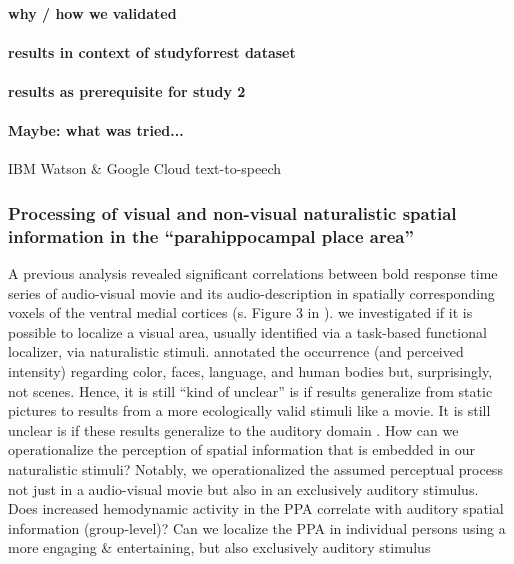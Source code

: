 \paragraph{why / how we validated}


\paragraph{results in context of studyforrest dataset}


\paragraph{results as prerequisite for study 2}


\paragraph{Maybe: what was tried...}

IBM Watson \& Google Cloud text-to-speech


\subsubsection{Processing of visual and non-visual naturalistic spatial
information in the ``parahippocampal place area''}

%

%
A previous analysis \citep{hanke2016simultaneous} revealed significant
correlations between \ac{bold} response time series of audio-visual movie and
its audio-description in spatially corresponding voxels of the ventral medial
cortices (s. Figure 3 in \citep{hanke2016simultaneous}).
%
we investigated if it is possible to localize a visual area, usually
identified via a task-based functional localizer, via naturalistic stimuli.
%
\citep{bartels2004mapping} annotated the occurrence (and perceived intensity)
regarding color, faces, language, and human bodies but, surprisingly, not
scenes.
%
Hence, it is still ``kind of unclear'' is if results generalize from
static pictures to results from a more ecologically valid stimuli
like a movie.
%
It is still unclear is if these results generalize to the auditory domain
\citep{aziz2008modulation}.
%
How can we operationalize the perception of spatial information that is
embedded in our naturalistic stimuli?
%
Notably, we operationalized the assumed perceptual process not just in a
audio-visual movie but also in an exclusively auditory stimulus.
%
Does increased hemodynamic activity in the PPA correlate with auditory spatial
information (group-level)?
%
Can we localize the PPA in individual persons using a more engaging
\& entertaining, but also exclusively auditory stimulus

